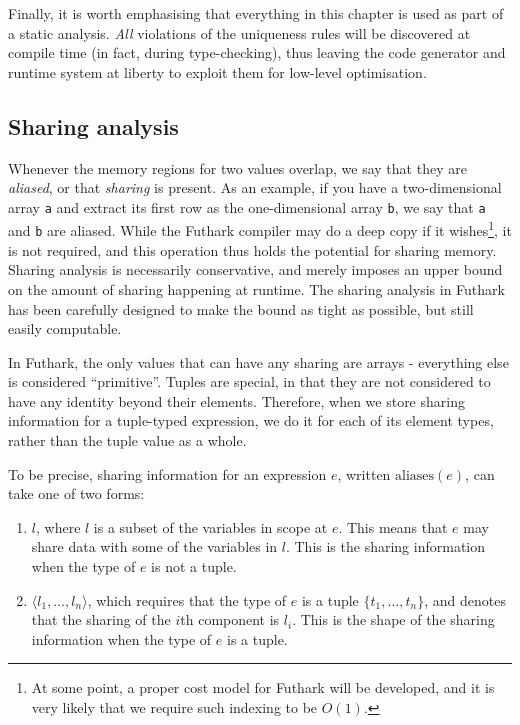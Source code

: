 \documentclass[oneside]{memoir}
\newcommand\aliases[1]{\textrm{aliases}(#1)}
\begin{document}
Finally, it is worth emphasising that everything in this chapter is
used as part of a static analysis.  \textit{All} violations of the
uniqueness rules will be discovered at compile time (in fact, during
type-checking), thus leaving the code generator and runtime system at
liberty to exploit them for low-level optimisation.

\subsection{Sharing analysis}
\label{sec:futhark-sharing}

Whenever the memory regions for two values overlap, we say that they
are \textit{aliased}, or that \textit{sharing} is present.  As an
example, if you have a two-dimensional array \texttt{a} and extract
its first row as the one-dimensional array \texttt{b}, we say that
\texttt{a} and \texttt{b} are aliased.  While the Futhark compiler may
do a deep copy if it wishes\footnote{At some point, a proper cost
  model for Futhark will be developed, and it is very likely that we
  require such indexing to be $O(1)$.}, it is not required, and this
operation thus holds the potential for sharing memory.  Sharing
analysis is necessarily conservative, and merely imposes an upper
bound on the amount of sharing happening at runtime.  The sharing
analysis in Futhark has been carefully designed to make the bound as
tight as possible, but still easily computable.

In Futhark, the only values that can have any sharing are arrays -
everything else is considered ``primitive''.  Tuples are special, in
that they are not considered to have any identity beyond their
elements.  Therefore, when we store sharing information for a
tuple-typed expression, we do it for each of its element types, rather
than the tuple value as a whole.

To be precise, sharing information for an expression $e$, written
$\aliases{e}$, can take one of two forms:

\begin{enumerate}
\item $l$, where $l$ is a subset of the variables in scope at $e$.
  This means that $e$ may share data with some of the variables in
  $l$.  This is the sharing information when the type of $e$ is not a
  tuple.

\item $\langle l_{1}, \ldots, l_{n} \rangle$, which requires that the
  type of $e$ is a tuple $\{t_{1}, \ldots, t_{n}\}$, and denotes that
  the sharing of the $i$th component is $l_{i}$.  This is the shape of
  the sharing information when the type of $e$ is a tuple.
\end{enumerate}
\end{document}
